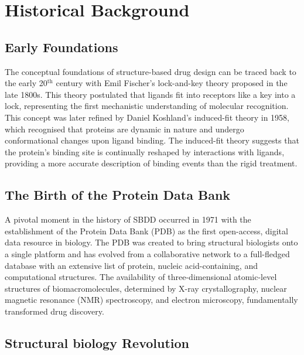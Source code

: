 \documentclass[12pt]{article}
\begin{document}
\section{Historical Background}



\subsection{Early Foundations}

The conceptual foundations of structure-based drug design can be traced back to the early 20$^{\text{th}}$ century with Emil Fischer’s lock-and-key theory proposed in the late 1800s\cite{CH1_1}. This theory postulated that ligands fit into receptors like a key into a lock, representing the first mechanistic understanding of molecular recognition. This concept was later refined by Daniel Koshland’s induced-fit theory in 1958\cite{CH1_2}, which recognised that proteins are dynamic in nature and undergo conformational changes upon ligand binding. The induced-fit theory suggests that the protein's binding site is continually reshaped by interactions with ligands, providing a more accurate description of binding events than the rigid treatment.



\subsection{The Birth of the Protein Data Bank}

A pivotal moment in the history of SBDD occurred in 1971 with the establishment of the Protein Data Bank (PDB) as the first open-access, digital data resource in biology\cite{CH1_3}. The PDB was created to bring structural biologists onto a single platform and has evolved from a collaborative network to a full-fledged database with an extensive list of protein, nucleic acid-containing, and computational structures. The availability of three-dimensional atomic-level structures of biomacromolecules, determined by X-ray crystallography, nuclear magnetic resonance (NMR) spectroscopy, and electron microscopy, fundamentally transformed drug discovery.



\subsection{Structural biology Revolution}
\end{document}
